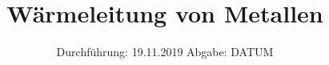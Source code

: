 

\subject{Versuch 204}
\title{Wärmeleitung von Metallen}
\date{%
  Durchführung: 19.11.2019
  \hspace{3em}
  Abgabe: DATUM
}



\maketitle
\thispagestyle{empty}
\tableofcontents
\newpage









\printbibliography{}


